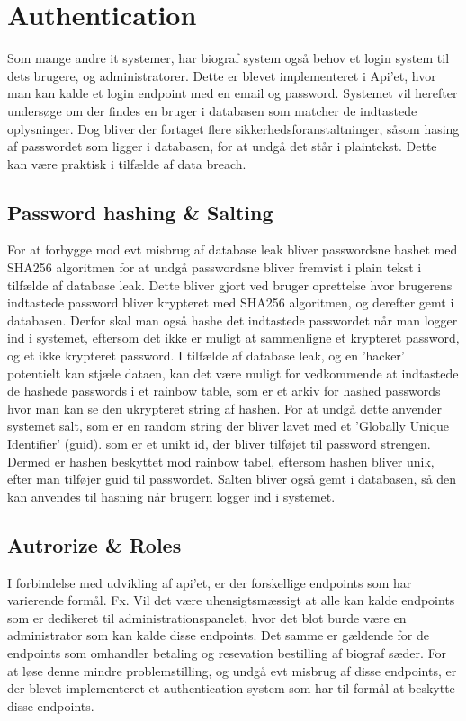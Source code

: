 ﻿\section{Authentication}\label{sec:auth}
Som mange andre it systemer, har biograf system også behov et login system til dets brugere, og administratorer.
Dette er blevet implementeret i Api'et, hvor man kan kalde et login endpoint med en email og password. 
Systemet vil herefter undersøge om der findes en bruger i databasen som matcher de indtastede oplysninger.
Dog bliver der fortaget flere sikkerhedsforanstaltninger, såsom hasing af passwordet som ligger i databasen,
for at undgå det står i plaintekst. Dette kan være praktisk i tilfælde af data breach.\\

\subsection{Password hashing \& Salting}
For at forbygge mod evt misbrug af database leak bliver passwordsne hashet med SHA256 algoritmen for at undgå passwordsne
bliver fremvist i plain tekst i tilfælde af database leak. Dette bliver gjort ved bruger oprettelse hvor brugerens indtastede 
password bliver krypteret med SHA256 algoritmen, og derefter gemt i databasen. Derfor skal man også hashe det indtastede 
passwordet når man logger ind i systemet, eftersom det ikke er muligt at sammenligne et krypteret password, og et ikke krypteret password.
I tilfælde af database leak, og en 'hacker' potentielt kan stjæle dataen, kan det være muligt for vedkommende at indtastede
de hashede passwords i et rainbow table, som er et arkiv for hashed passwords hvor man kan se den ukrypteret string af hashen.
For at undgå dette anvender systemet salt, som er en random string der bliver lavet med et 'Globally Unique Identifier' (guid).
som er et unikt id, der bliver tilføjet til password strengen. Dermed er hashen beskyttet mod rainbow tabel, eftersom hashen 
bliver unik, efter man tilføjer guid til passwordet. Salten bliver også gemt i databasen, så den kan anvendes til hasning
når brugern logger ind i systemet.\\

\subsection{Autrorize \& Roles}
I forbindelse med udvikling af api'et, er der forskellige endpoints som har varierende formål. Fx. Vil det være
uhensigtsmæssigt at alle kan kalde endpoints som er dedikeret til administrationspanelet, hvor det blot burde være
en administrator som kan kalde disse endpoints. Det samme er gældende for de endpoints som omhandler betaling og
resevation bestilling af biograf sæder. For at løse denne mindre problemstilling, og undgå evt misbrug af disse 
endpoints, er der blevet implementeret et authentication system som har til formål at beskytte disse endpoints.


